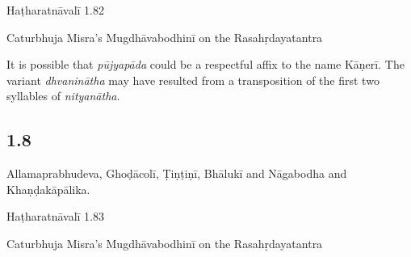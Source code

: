 \begin{ekdosis}
\begin{testimonia}[hp01_007]
Haṭharatnāvalī 1.82

\begin{versinnote}
\end{versinnote}

Caturbhuja Misra's Mugdhāvabodhinī on the Rasahṛdayatantra
​​
\begin{versinnote}
\end{versinnote}

\end{testimonia}

\begin{philcomm}[hp01_007]   
It is possible that \emph{pūjyapāda} could be a respectful affix to the name Kāṇerī. The variant \emph{dhvaninātha} may have resulted from a transposition of the first two syllables of \emph{nityanātha}.    
\end{philcomm}

\subsection*{1.8}
\begin{translation}[hp01_008]
Allamaprabhudeva, Ghoḍācolī, Ṭiṇṭiṇī, Bhālukī and Nāgabodha and Khaṇḍakāpālika.
\end{translation}

\begin{testimonia}[hp01_008]
Haṭharatnāvalī 1.83

\begin{versinnote}
\end{versinnote}

Caturbhuja Misra's Mugdhāvabodhinī on the Rasahṛdayatantra

\begin{versinnote}
\end{versinnote}


\end{testimonia}
\end{ekdosis}
